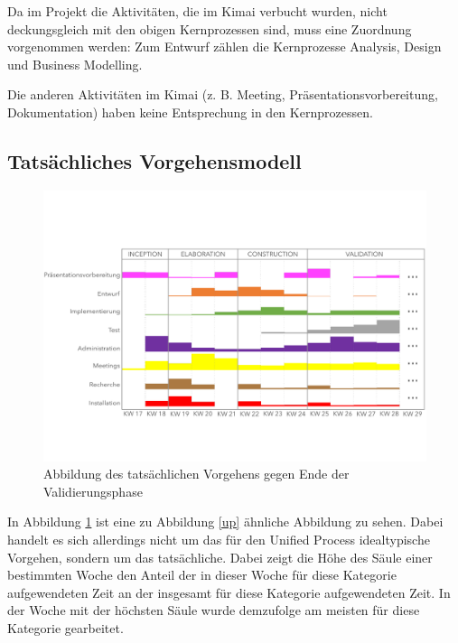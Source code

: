 \documentclass[../review_3.tex]{subfiles}
\begin{document}
Da im Projekt die Aktivitäten, die im Kimai verbucht wurden, nicht deckungsgleich mit den obigen Kernprozessen sind, muss eine Zuordnung vorgenommen werden: Zum Entwurf zählen die Kernprozesse Analysis, Design und Business Modelling.

Die anderen Aktivitäten im Kimai (z. B. Meeting, Präsentationsvorbereitung, Dokumentation) haben keine Entsprechung in den Kernprozessen.

\subsection{Tatsächliches Vorgehensmodell}

\begin{figure} [h]
    \centering
    \includegraphics[width = \linewidth]{img/kimai21.pdf}
    \caption{Abbildung des tatsächlichen Vorgehens gegen Ende der Validierungsphase}
    \label{kimai21}
\end{figure}

In Abbildung \ref{kimai21} ist eine zu Abbildung \ref{up} ähnliche Abbildung zu sehen. Dabei handelt es sich allerdings nicht um das für den Unified Process idealtypische Vorgehen, sondern um das tatsächliche. Dabei zeigt die Höhe des Säule einer bestimmten Woche den Anteil der in dieser Woche für diese Kategorie aufgewendeten Zeit an der insgesamt für diese Kategorie aufgewendeten Zeit. In der Woche mit der höchsten Säule wurde demzufolge am meisten für diese Kategorie gearbeitet.
\end{document}
